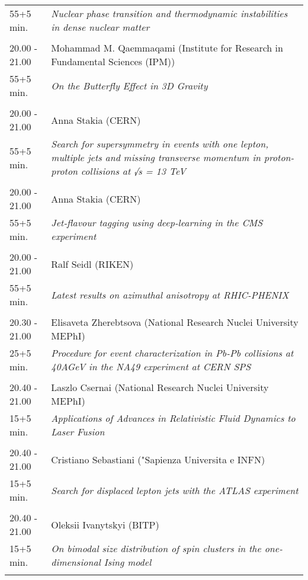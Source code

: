 \begin{longtable}{p{3cm}p{13cm}}
55+5 min. & {\it Nuclear phase transition and thermodynamic instabilities in dense nuclear matter}\\ 
 & \\ 
20.00 - 21.00 & Mohammad M. Qaemmaqami (Institute for Research in Fundamental Sciences (IPM))\\ 
55+5 min. & {\it On the Butterfly Effect in 3D Gravity}\\ 
 & \\ 
20.00 - 21.00 & Anna Stakia (CERN)\\ 
55+5 min. & {\it Search for supersymmetry in events with one lepton, multiple jets and missing transverse momentum in proton-proton collisions at √s = 13 TeV}\\ 
 & \\ 
20.00 - 21.00 & Anna Stakia (CERN)\\ 
55+5 min. & {\it Jet-flavour tagging using deep-learning in the CMS experiment}\\ 
 & \\ 
20.00 - 21.00 & Ralf Seidl (RIKEN)\\ 
55+5 min. & {\it Latest results on azimuthal anisotropy at RHIC-PHENIX}\\ 
 & \\ 
20.30 - 21.00 & Elisaveta Zherebtsova (National Research Nuclei University MEPhI)\\ 
25+5 min. & {\it Procedure for event characterization in Pb-Pb collisions at 40AGeV in the NA49 experiment at CERN SPS}\\ 
 & \\ 
20.40 - 21.00 & Laszlo Csernai (National Research Nuclei University MEPhI)\\ 
15+5 min. & {\it Applications of Advances in Relativistic Fluid Dynamics to Laser Fusion}\\ 
 & \\ 
20.40 - 21.00 & Cristiano Sebastiani ("Sapienza Universita e INFN)\\ 
15+5 min. & {\it Search for displaced lepton jets with the ATLAS experiment}\\ 
 & \\ 
20.40 - 21.00 & Oleksii Ivanytskyi (BITP)\\ 
15+5 min. & {\it On bimodal size distribution of spin clusters in the one-dimensional Ising model}\\ 
 & \\ 
\end{longtable}

